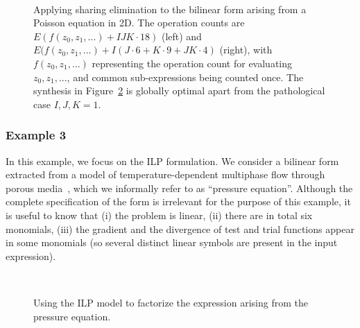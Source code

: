 \begin{figure}[h]
\begin{CenteredBox}
\begin{subfigure}{0.40\textwidth}

\label{code:poisson_a}
\end{subfigure}
~~~~~~~~~~
\begin{subfigure}{0.40\textwidth}

\label{code:poisson_b}
\end{subfigure}

\end{CenteredBox}
\caption{Applying sharing elimination to the bilinear form arising from a Poisson equation in 2D. The operation counts are $E(f(z_0, z_1, ...) + IJK \cdot 18)$ (left) and $E(f(z_0, z_1, ...) + I(J \cdot 6 + K \cdot 9 + JK \cdot 4)$ (right), with $f(z_0, z_1, ...)$ representing the operation count for evaluating $z_0, z_1, ...$, and common sub-expressions being counted once. The synthesis in Figure~\ref{code:poisson_b} is globally optimal apart from the pathological case  $I, J, K = 1$.}
\label{code:poisson}
\end{figure}

\subsubsection{Example 3}
In this example, we focus on the ILP formulation. We consider a bilinear form extracted from a model of temperature-dependent multiphase flow through porous media~\citep{quadrature-olegaard}, which we informally refer to as ``pressure equation''. Although the complete specification of the form is irrelevant for the purpose of this example, it is useful to know that (i) the problem is linear, (ii) there are in total six monomials, (iii) the gradient and the divergence of test and trial functions appear in some monomials (so several distinct linear symbols are present in the input expression). 

\begin{figure}[htp]

\begin{subfigure}{\textwidth}

\label{code:pressure_a}
\end{subfigure}
~\\
\begin{subfigure}{\textwidth}

\label{code:pressure_b}
\end{subfigure}

\caption{Using the ILP model to factorize the expression arising from the pressure equation.}
\label{code:pressure}
\end{figure}

